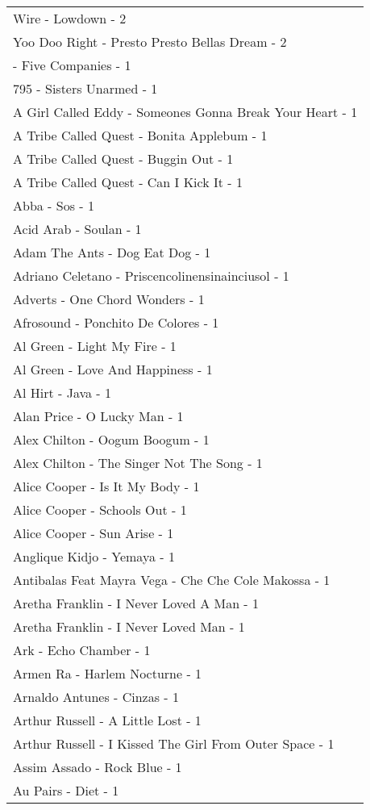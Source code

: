 \documentclass[
]{article}
\begin{document}
\begin{longtable}{l}
Wire - Lowdown - 2 \\ 
Yoo Doo Right - Presto Presto Bellas Dream - 2 \\ 
 - Five Companies - 1 \\ 
795 - Sisters Unarmed - 1 \\ 
A Girl Called Eddy - Someones Gonna Break Your Heart - 1 \\ 
A Tribe Called Quest - Bonita Applebum - 1 \\ 
A Tribe Called Quest - Buggin Out - 1 \\ 
A Tribe Called Quest - Can I Kick It - 1 \\ 
Abba - Sos - 1 \\ 
Acid Arab - Soulan - 1 \\ 
Adam The Ants - Dog Eat Dog - 1 \\ 
Adriano Celetano - Priscencolinensinainciusol - 1 \\ 
Adverts - One Chord Wonders - 1 \\ 
Afrosound - Ponchito De Colores - 1 \\ 
Al Green - Light My Fire - 1 \\ 
Al Green - Love And Happiness - 1 \\ 
Al Hirt - Java - 1 \\ 
Alan Price - O Lucky Man - 1 \\ 
Alex Chilton - Oogum Boogum - 1 \\ 
Alex Chilton - The Singer Not The Song - 1 \\ 
Alice Cooper - Is It My Body - 1 \\ 
Alice Cooper - Schools Out - 1 \\ 
Alice Cooper - Sun Arise - 1 \\ 
Anglique Kidjo - Yemaya - 1 \\ 
Antibalas Feat Mayra Vega - Che Che Cole Makossa - 1 \\ 
Aretha Franklin - I Never Loved A Man - 1 \\ 
Aretha Franklin - I Never Loved Man - 1 \\ 
Ark - Echo Chamber - 1 \\ 
Armen Ra - Harlem Nocturne - 1 \\ 
Arnaldo Antunes - Cinzas - 1 \\ 
Arthur Russell - A Little Lost - 1 \\ 
Arthur Russell - I Kissed The Girl From Outer Space - 1 \\ 
Assim Assado - Rock Blue - 1 \\ 
Au Pairs - Diet - 1 \\ 

\end{longtable}
\end{document}
